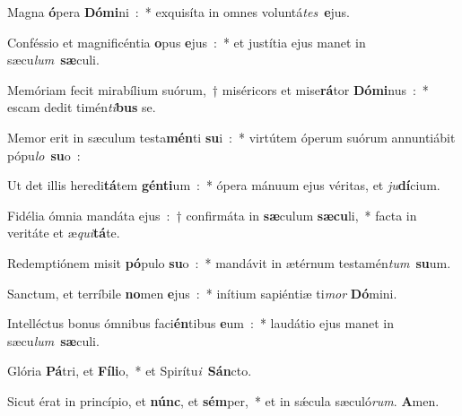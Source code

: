 ﻿\item Magna \textbf{ó}\-pera \textbf{Dó}\-\textbf{mi}\-ni~:~* exquisíta in omnes voluntá\emph{tes}\ \textbf{e}jus.
\item Conféssio et magnificéntia \textbf{o}\-pus \textbf{e}\-jus~:~* et justítia ejus manet in sæcu\emph{lum}\ \textbf{sæ}culi.
\item Memóriam fecit mirabílium suórum,~† miséricors et mise\textbf{rá}\-tor \textbf{Dó}\-\textbf{mi}\-nus~:~* escam dedit timén\emph{ti}\-\textbf{bus} se.
\item Memor erit in sæculum testa\textbf{mén}\-ti \textbf{su}\-i~:~* virtútem óperum suórum annuntiábit pópu\emph{lo}\ \textbf{su}o~:
\item Ut det illis heredi\textbf{tá}\-tem \textbf{gén}\-\textbf{ti}\-um~:~* ópera mánuum ejus véritas, et \emph{ju}\textbf{dí}cium.
\item Fidélia ómnia mandáta ejus~:~† confirmáta in \textbf{sæ}\-culum \textbf{sæ}\-\textbf{cu}\-li,~* facta in veritáte et æ\emph{qui}\textbf{tá}te.
\item Redemptiónem misit \textbf{pó}\-pulo \textbf{su}\-o~:~* mandávit in ætérnum testamén\emph{tum}\ \textbf{su}um.
\item Sanctum, et terríbile \textbf{no}\-men \textbf{e}\-jus~:~* inítium sapiéntiæ ti\emph{mor} \textbf{Dó}mini.
\item Intelléctus bonus ómnibus faci\textbf{én}\-tibus \textbf{e}\-um~:~* laudátio ejus manet in sæcu\emph{lum}\ \textbf{sæ}culi.
\item Glória \textbf{Pá}\-tri, et \textbf{Fí}\-\textbf{li}\-o,~* et Spirítu\emph{i}\ \textbf{Sán}cto.
\item Sicut érat in princípio, et \textbf{núnc}, et \textbf{sém}\-per,~* et in sǽcula sæculó\emph{rum}. \textbf{A}men.